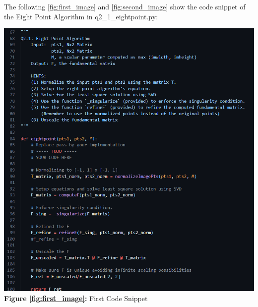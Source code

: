 \begin{your_solution}[title=Q2.1,height=23.2cm,width=\linewidth]
The following \autoref{fig:first_image} and \autoref{fig:second_image} show the code snippet of the Eight Point Algorithm in q2\_1\_eightpoint.py:
\newline
\begin{minipage}{0.48\linewidth}
	\centering
	\includegraphics[width=\linewidth]{../Q2_1_cns1.png}
    \textbf{Figure \ref{fig:first_image}:} First Code Snippet  %
	\label{fig:first_image}         %
\end{minipage}
\hfill
\begin{minipage}{0.48\linewidth}
	\centering

\end{minipage}
\end{your_solution}
